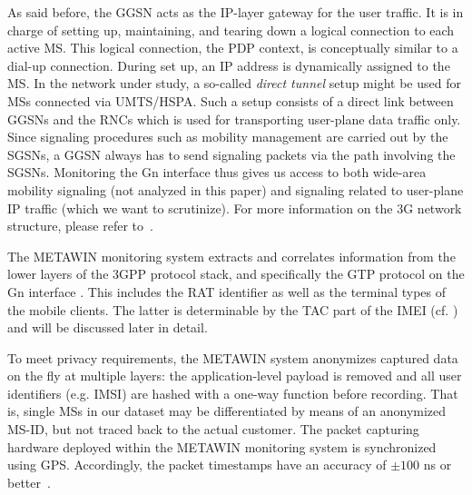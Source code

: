 As said before, the \ac{GGSN} acts as the IP-layer gateway for the user traffic. It is in charge of setting up,
maintaining, and tearing down a logical connection to each active \ac{MS}. This logical connection, the \ac{PDP} context,
is conceptually similar to a dial-up connection. During set up, an
IP address is dynamically assigned to the \ac{MS}.
In the network under study, a so-called \textit{direct tunnel} setup might be used for \acp{MS} connected
via \ac{UMTS}/\ac{HSPA}. Such a setup consists of a direct link between \acp{GGSN} and the
\acp{RNC} %
which is used for
transporting user-plane data traffic only. Since signaling procedures such
as mobility management are carried out by the \acp{SGSN}, a \ac{GGSN} always has to send signaling packets
via the path involving the \acp{SGSN}. Monitoring the Gn interface thus gives us access to both wide-area mobility signaling (not analyzed in this paper) %
and signaling related to user-plane IP traffic (which we want to scrutinize).
For more information on the \ac{3G} network structure, please refer to~\cite{bannister_convergence_2004}.

The METAWIN monitoring system extracts and correlates information from the lower
layers of the \ac{3GPP} protocol stack, and specifically the \ac{GTP} protocol
on the Gn interface \cite{etsi_3gpp_2008}. This includes the \acf{RAT} identifier as well as the terminal types of the mobile clients. The
latter is determinable by the \acf{TAC} part of the \acf{IMEI} (cf. \cite{3gpp23003}) and will be discussed later in detail.

To meet privacy requirements, the METAWIN system anonymizes captured data on the fly at multiple
layers: the application-level payload is removed and all user identifiers (e.g. \ac{IMSI}) are
hashed with a one-way function before recording. That is, single
\acp{MS} in our dataset may be differentiated by means of an anonymized \ac{MS-ID}, but not traced back to the actual customer.
The packet capturing hardware deployed within the METAWIN monitoring system is synchronized
using \ac{GPS}. Accordingly, the packet timestamps
have an accuracy of $\pm100$ ns or better~\cite[p.97-98]{donnelly_high_2002}.



